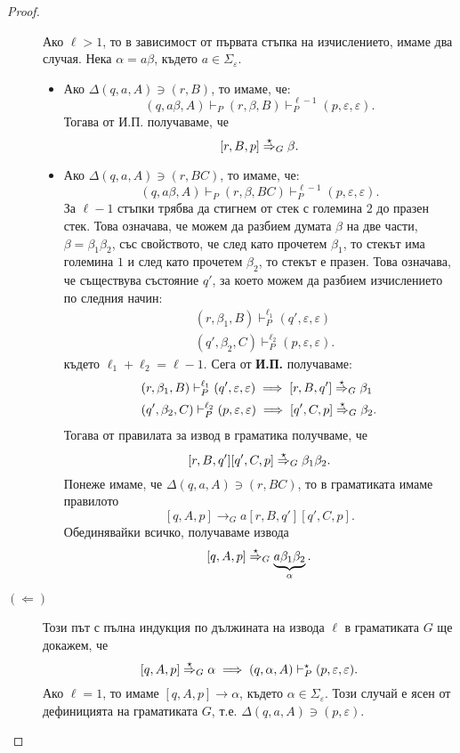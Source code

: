 \begin{proof}
\begin{description}
    Ако $\ell > 1$, то в зависимост от първата стъпка на изчислението, имаме два случая.
    Нека $\alpha = a\beta$, където $a \in \Sigma_\varepsilon$.
    \begin{itemize}
    \item 
      Ако $\Delta(q,a,A) \ni (r,B)$, то имаме, че:
      \[(q,a\beta,A) \vdash_P (r,\beta,B) \vdash^{\ell-1}_P (p, \varepsilon, \varepsilon).\]
      Тогава от И.П. получаваме, че
      \[[r,B,p] \stackrel{{\star}}{\Rightarrow}_G \beta.\]
    \item
      Ако $\Delta(q, a, A) \ni (r, BC)$, то имаме, че:
      \[(q, a\beta, A) \vdash_P (r, \beta, BC) \vdash^{\ell-1}_P (p, \varepsilon, \varepsilon).\]      
      За $\ell-1$ стъпки трябва да стигнем от стек с големина $2$ до празен стек.
      Това означава, че можем да разбием думата $\beta$ на две части, $\beta = \beta_1\beta_2$, със свойството, че след като прочетем $\beta_1$,
      то стекът има големина $1$ и след като прочетем $\beta_2$, то стекът е празен.
      Това означава, че съществува състояние $q'$, за което можем да разбием изчислението по следния начин:
      \begin{align*}
        & (r, \beta_1, B) \vdash^{\ell_1}_P (q',\varepsilon,\varepsilon)\\
        & (q', \beta_2, C) \vdash^{\ell_2}_P (p,\varepsilon,\varepsilon).
      \end{align*}
      където $\ell_1 + \ell_2 = \ell - 1$.    
      Сега от {\bf И.П.} получаваме:
      \begin{align*}
        & (r, \beta_1, B) \vdash^{\ell_1}_P (q', \varepsilon, \varepsilon) \implies [r, B, q'] \stackrel{{\star}}{\Rightarrow}_G \beta_1\\
        & (q', \beta_2, C) \vdash^{\ell_2}_P (p, \varepsilon, \varepsilon) \implies [q', C, p] \stackrel{{\star}}{\Rightarrow}_G \beta_2.
      \end{align*}
      Тогава от правилата за извод в граматика получваме, че
      \[[r,B,q'][q',C,p] \stackrel{{\star}}{\Rightarrow}_G \beta_1\beta_2.\]
      Понеже имаме, че $\Delta(q,a,A) \ni (r,BC)$, то в граматиката имаме правилото
      \[[q,A,p] \to_G a[r,B,q'][q',C,p].\]
      Обединявайки всичко, получаваме извода
      \[[q,A,p] \stackrel{{\star}}{\Rightarrow}_G \underbrace{a\beta_1\beta_2}_{\alpha}.\]
    \end{itemize}
  \item[$(\Leftarrow)$]
    Този път с пълна индукция по дължината на извода $\ell$ в граматиката $G$ ще докажем, че
    \[[q,A,p] \stackrel{{\star}}{\Rightarrow}_G \alpha \implies (q,\alpha,A) \vdash^\star_P (p,\varepsilon,\varepsilon).\]
    Ако $\ell = 1$, то имаме $[q,A,p] \rightarrow \alpha$, където $\alpha \in \Sigma_\varepsilon$.
    Този случай е ясен от дефиницията на граматиката $G$, т.е. $\Delta(q,a,A) \ni (p,\varepsilon)$.


\end{description}
\end{proof}
